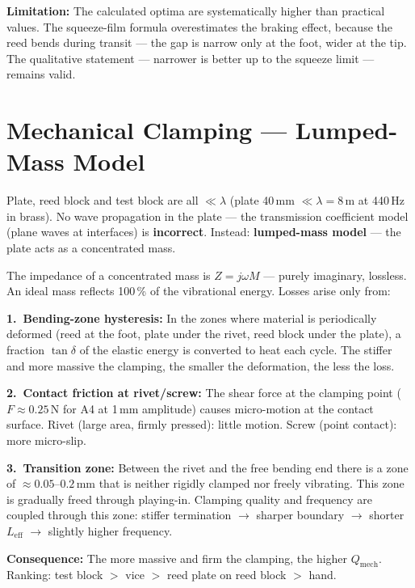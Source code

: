 \documentclass[11pt,a4paper]{article}
\begin{document}
\begin{warnbox}
\textbf{Limitation:} The calculated optima are systematically higher than practical values. The squeeze-film formula overestimates the braking effect, because the reed bends during transit --- the gap is narrow only at the foot, wider at the tip. The qualitative statement --- narrower is better up to the squeeze limit --- remains valid.
\end{warnbox}

\section{Mechanical Clamping --- Lumped-Mass Model}

Plate, reed block and test block are all $\ll \lambda$ (plate 40\,mm $\ll \lambda = 8$\,m at 440\,Hz in brass). No wave propagation in the plate --- the transmission coefficient model (plane waves at interfaces) is \textbf{incorrect}. Instead: \textbf{lumped-mass model} --- the plate acts as a concentrated mass.

The impedance of a concentrated mass is $Z = j\omega M$ --- purely imaginary, lossless. An ideal mass reflects 100\,\% of the vibrational energy. Losses arise only from:

\textbf{1.\ Bending-zone hysteresis:} In the zones where material is periodically deformed (reed at the foot, plate under the rivet, reed block under the plate), a fraction $\tan\delta$ of the elastic energy is converted to heat each cycle. The stiffer and more massive the clamping, the smaller the deformation, the less the loss.

\textbf{2.\ Contact friction at rivet/screw:} The shear force at the clamping point ($F \approx 0{.}25$\,N for A4 at 1\,mm amplitude) causes micro-motion at the contact surface. Rivet (large area, firmly pressed): little motion. Screw (point contact): more micro-slip.

\textbf{3.\ Transition zone:} Between the rivet and the free bending end there is a zone of $\approx 0{.}05$--$0{.}2$\,mm that is neither rigidly clamped nor freely vibrating. This zone is gradually freed through playing-in. Clamping quality and frequency are coupled through this zone: stiffer termination $\to$ sharper boundary $\to$ shorter $L_\text{eff}$ $\to$ slightly higher frequency.

\begin{keybox}
\textbf{Consequence:} The more massive and firm the clamping, the higher $Q_\text{mech}$. Ranking: test block $>$ vice $>$ reed plate on reed block $>$ hand.
\end{keybox}
\end{document}
